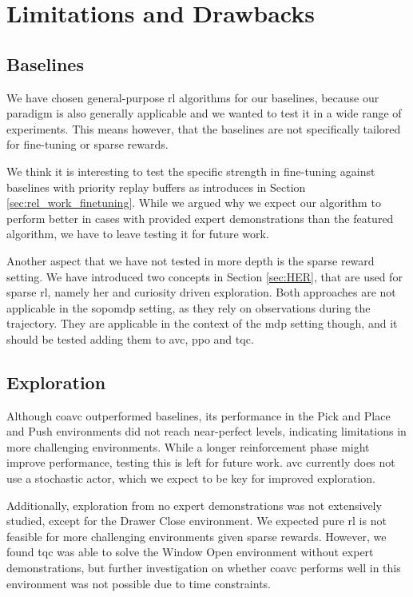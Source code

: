 \section{Limitations and Drawbacks}
\subsection{Baselines}
We have chosen general-purpose \ac{rl} algorithms for our baselines, because our paradigm is also generally applicable 
and we wanted to test it in a wide range of experiments. This means however, that the baselines are not specifically tailored for fine-tuning or sparse rewards. 

We think it is interesting to test the specific strength in fine-tuning against baselines with priority replay buffers as introduces in Section \ref{sec:rel_work_finetuning}. 
While we argued why we expect our algorithm to perform better in cases with provided expert demonstrations than the featured algorithm, we have to 
leave testing it for future work.

Another aspect that we have not tested in more depth is the sparse reward setting. We have introduced two concepts in Section \ref{sec:HER}, that are used for sparse \ac{rl}, namely 
\ac{her} and curiosity driven exploration. Both approaches are not applicable in the \ac{sopomdp} setting, as they rely on observations during the trajectory. 
They are applicable in the context of the \ac{mdp} setting though, and it should be tested adding them to \ac{avc}, \ac{ppo} and \ac{tqc}.

\subsection{Exploration}
Although \ac{coavc} outperformed baselines, its performance in the Pick and Place and Push environments did not reach near-perfect levels, 
indicating limitations in more challenging environments. While a longer reinforcement phase might improve performance, testing this is left for 
future work. \ac{avc} currently does not use a stochastic actor, which we expect to be key for improved exploration.

Additionally, exploration from no expert demonstrations was not extensively studied, except for the Drawer Close 
environment. We expected pure \ac{rl} is not feasible for more challenging environments given sparse rewards. 
However, we found \ac{tqc} was able to solve the Window Open environment without expert demonstrations, but further investigation on whether 
\ac{coavc} performs well in this environment was not possible due to time constraints.

